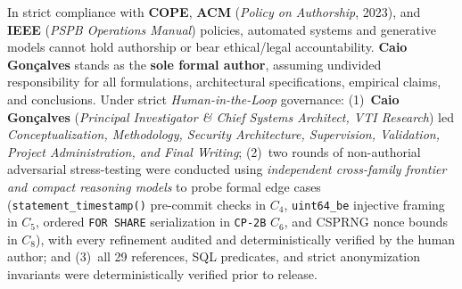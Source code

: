 \documentclass[10pt,twocolumn]{article}
\begin{document}
In strict compliance with \textbf{COPE}, \textbf{ACM} (\emph{Policy on Authorship}, 2023), and \textbf{IEEE} (\emph{PSPB Operations Manual}) policies, automated systems and generative models cannot hold authorship or bear ethical/legal accountability. \textbf{Caio Gon\c{c}alves} stands as the \textbf{sole formal author}, assuming undivided responsibility for all formulations, architectural specifications, empirical claims, and conclusions. Under strict \emph{Human-in-the-Loop} governance: (1)~\textbf{Caio Gon\c{c}alves} (\emph{Principal Investigator \& Chief Systems Architect, VTI Research}) led \emph{Conceptualization, Methodology, Security Architecture, Supervision, Validation, Project Administration, and Final Writing}; (2)~two rounds of non-authorial adversarial stress-testing were conducted using \emph{independent cross-family frontier and compact reasoning models} to probe formal edge cases (\texttt{statement\_timestamp()} pre-commit checks in $C_4$, \texttt{uint64\_be} injective framing in $C_5$, ordered \texttt{FOR SHARE} serialization in \texttt{CP-2B} $C_6$, and CSPRNG nonce bounds in $C_8$), with every refinement audited and deterministically verified by the human author; and (3)~all 29 references, SQL predicates, and strict anonymization invariants were deterministically verified prior to release.



\end{document}

